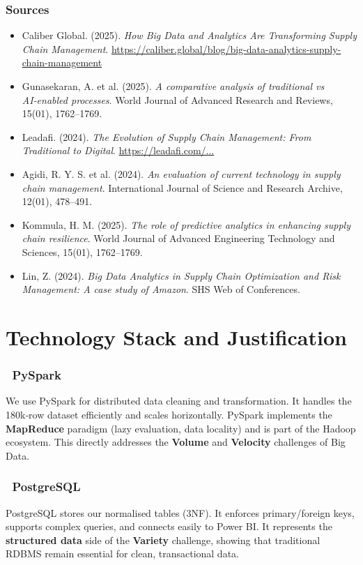 \documentclass[12pt, a4paper]{report}
\begin{document}
\subsection*{Sources}
{\small\raggedright
\begin{itemize}[noitemsep, topsep=0pt]
   \item Caliber Global. (2025). \textit{How Big Data and Analytics Are Transforming Supply Chain Management}. \url{https://caliber.global/blog/big-data-analytics-supply-chain-management}
   \item Gunasekaran, A. et al. (2025). \textit{A comparative analysis of traditional vs AI‑enabled processes}. World Journal of Advanced Research and Reviews, 15(01), 1762–1769.
   \item Leadafi. (2024). \textit{The Evolution of Supply Chain Management: From Traditional to Digital}. \url{https://leadafi.com/...}
   \item Agidi, R. Y. S. et al. (2024). \textit{An evaluation of current technology in supply chain management}. International Journal of Science and Research Archive, 12(01), 478–491.
   \item Kommula, H. M. (2025). \textit{The role of predictive analytics in enhancing supply chain resilience}. World Journal of Advanced Engineering Technology and Sciences, 15(01), 1762–1769.
   \item Lin, Z. (2024). \textit{Big Data Analytics in Supply Chain Optimization and Risk Management: A case study of Amazon}. SHS Web of Conferences.
\end{itemize}
}

\chapter{Technology Stack and Justification}
\subsection*{\faPython\ PySpark}
We use PySpark for distributed data cleaning and transformation. It handles the 180k‑row dataset efficiently and scales horizontally. PySpark implements the \textbf{MapReduce} paradigm (lazy evaluation, data locality) and is part of the Hadoop ecosystem. This directly addresses the \textbf{Volume} and \textbf{Velocity} challenges of Big Data.

\subsection*{\faDatabase\ PostgreSQL}
PostgreSQL stores our normalised tables (3NF). It enforces primary/foreign keys, supports complex queries, and connects easily to Power BI. It represents the \textbf{structured data} side of the \textbf{Variety} challenge, showing that traditional RDBMS remain essential for clean, transactional data.
\end{document}
